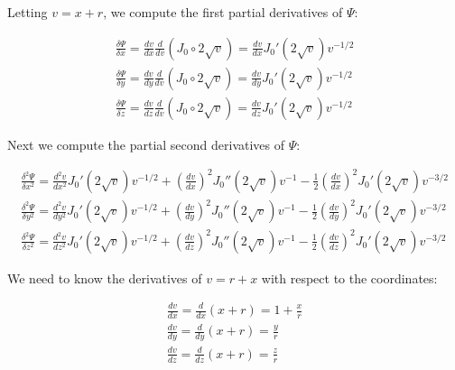 \documentclass{article}
\begin{document}
Letting $v=x+r$, we compute the first partial derivatives of $\Psi$:

\begin{equation}
\begin{gathered}
\frac{\delta \Psi}{\delta x} = \frac{d v}{d x} \frac{d}{d v} \left(J_0 \circ 2\sqrt{v}\right) = \frac{d v}{d x} J_0'(2\sqrt{v}) v^{-1/2} \\
\frac{\delta \Psi}{\delta y} = \frac{d v}{d y} \frac{d}{d v} \left(J_0 \circ 2\sqrt{v}\right) = \frac{d v}{d y} J_0'(2\sqrt{v}) v^{-1/2} \\
\frac{\delta \Psi}{\delta z} = \frac{d v}{d z} \frac{d}{d v} \left(J_0 \circ 2\sqrt{v}\right) = \frac{d v}{d z} J_0'(2\sqrt{v}) v^{-1/2}
\end{gathered}
\end{equation}

\vskip 12pt

Next we compute the partial second derivatives of $\Psi$:

\begin{equation}
\label{second partials}
\begin{gathered}
\frac{\delta^2 \Psi}{\delta x^2} = \frac{d^2 v}{d x^2} J_0'(2\sqrt{v}) v^{-1/2} + \left(\frac{d v}{d x}\right)^2 J_0''(2\sqrt{v}) v^{-1} - \frac{1}{2} \left(\frac{d v}{d x}\right)^2 J_0'(2\sqrt{v}) v^{-3/2} \\
\frac{\delta^2 \Psi}{\delta y^2} = \frac{d^2 v}{d y^2} J_0'(2\sqrt{v}) v^{-1/2} + \left(\frac{d v}{d y}\right)^2 J_0''(2\sqrt{v}) v^{-1} - \frac{1}{2} \left(\frac{d v}{d y}\right)^2 J_0'(2\sqrt{v}) v^{-3/2} \\
\frac{\delta^2 \Psi}{\delta z^2} = \frac{d^2 v}{d z^2} J_0'(2\sqrt{v}) v^{-1/2} + \left(\frac{d v}{d z}\right)^2 J_0''(2\sqrt{v}) v^{-1} - \frac{1}{2} \left(\frac{d v}{d z}\right)^2 J_0'(2\sqrt{v}) v^{-3/2}
\end{gathered}
\end{equation}

\vskip 12pt

We need to know the derivatives of $v=r+x$ with respect to the coordinates:

\vskip 12pt

\begin{equation}
\label{first v}
\begin{gathered}
\frac{d v}{d x} = \frac{d}{d x} (x+r) = 1 + \frac{x}{r} \\
\frac{d v}{d y} = \frac{d}{d y} (x+r) = \frac{y}{r} \\
\frac{d v}{d z} = \frac{d}{d z} (x+r) = \frac{z}{r}
\end{gathered}
\end{equation}
\end{document}

